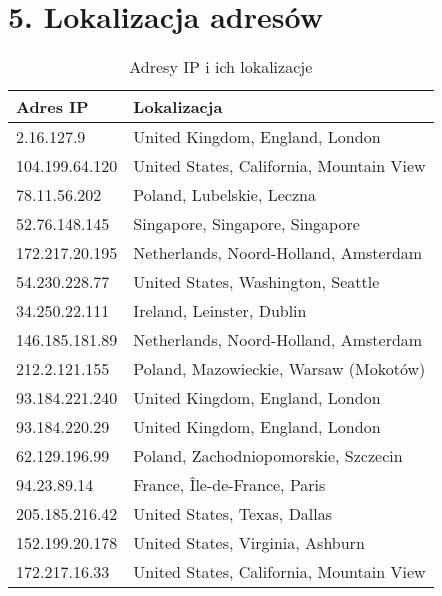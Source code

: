 \documentclass[12pt, a4paper]{article}
\begin{document}
\section*{5. Lokalizacja adresów}
\begin{table}[h]
    \centering
    \footnotesize
    \begin{tabular}{l | l}
        Adres IP & Lokalizacja \\ \hline
        2.16.127.9 & United Kingdom, England, London \\
        104.199.64.120 & United States,	California,	Mountain View \\
        78.11.56.202 & Poland, Lubelskie, Leczna \\
        52.76.148.145 & Singapore, Singapore, Singapore \\
        172.217.20.195 & Netherlands, 	Noord-Holland,	Amsterdam  \\
        54.230.228.77 & United States, 	Washington,	Seattle \\
        34.250.22.111 &  Ireland, 	Leinster,	Dublin\\
        146.185.181.89 & Netherlands, 	Noord-Holland,	Amsterdam \\
        212.2.121.155 & Poland, 	Mazowieckie,	Warsaw (Mokotów)  \\
        93.184.221.240 & United Kingdom, England,	London \\
        93.184.220.29 & United Kingdom, 	England,	London \\
        62.129.196.99 & Poland, 	Zachodniopomorskie,	Szczecin \\
        94.23.89.14 & France, 	Île-de-France,	Paris\\
        205.185.216.42 & United States, 	Texas,	Dallas  \\
        152.199.20.178 & United States, 	Virginia,	Ashburn \\
        172.217.16.33 & United States, 	California,	Mountain View \\
        \end{tabular}
    \caption{Adresy IP i ich lokalizacje}
\end{table}
\end{document}

